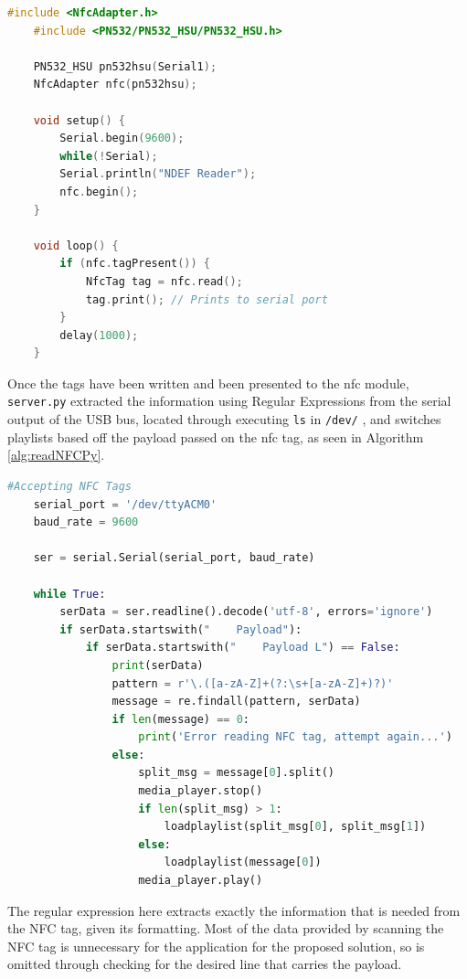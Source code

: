 \begin{algorithm}[H]
  \caption{reading\_nfc.ino - C++}
  \label{alg:readNFC}
  \begin{lstlisting}[language=C++]
    #include <NfcAdapter.h>
    #include <PN532/PN532_HSU/PN532_HSU.h>

    PN532_HSU pn532hsu(Serial1);
    NfcAdapter nfc(pn532hsu);

    void setup() {
        Serial.begin(9600);
        while(!Serial);
        Serial.println("NDEF Reader");
        nfc.begin();
    }

    void loop() {
        if (nfc.tagPresent()) {
            NfcTag tag = nfc.read();
            tag.print(); // Prints to serial port
        }
        delay(1000);
    }
  \end{lstlisting}
\end{algorithm}

Once the tags have been written and been presented to the \gls{nfc} module, \texttt{server.py} extracted the information using Regular Expressions from the serial output of the USB bus, located through executing \texttt{ls} in \texttt{/dev/} \citep{Quibits2026}, and switches playlists based off the payload passed on the \gls{nfc} tag, as seen in Algorithm \ref{alg:readNFCPy}.

\begin{algorithm}[H]
  \caption{nfc\_reader\_switch() - Python}
  \label{alg:readNFCPy}
  \begin{lstlisting}[language=Python]
    #Accepting NFC Tags
    serial_port = '/dev/ttyACM0'
    baud_rate = 9600

    ser = serial.Serial(serial_port, baud_rate)
   
    while True:
        serData = ser.readline().decode('utf-8', errors='ignore')
        if serData.startswith("    Payload"):
            if serData.startswith("    Payload L") == False:
                print(serData)
                pattern = r'\.([a-zA-Z]+(?:\s+[a-zA-Z]+)?)'
                message = re.findall(pattern, serData) 
                if len(message) == 0:
                    print('Error reading NFC tag, attempt again...')
                else:
                    split_msg = message[0].split()
                    media_player.stop()
                    if len(split_msg) > 1:
                        loadplaylist(split_msg[0], split_msg[1])
                    else:
                        loadplaylist(message[0])
                    media_player.play()

  \end{lstlisting}
\end{algorithm}
The regular expression here extracts exactly the information that is needed from the NFC tag, given its formatting. Most of the data provided by scanning the NFC tag is unnecessary for the application for the proposed solution, so is omitted through checking for the desired line that carries the payload.

